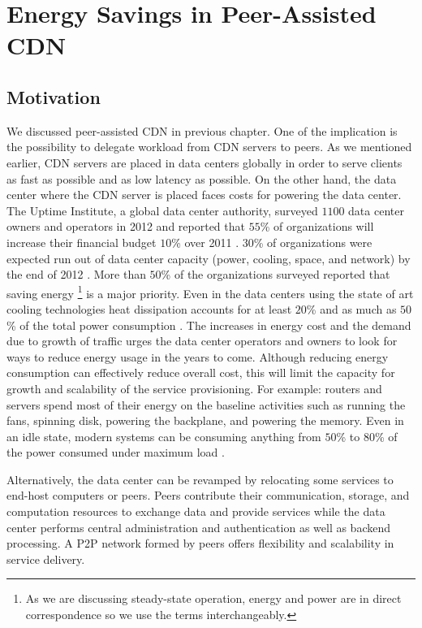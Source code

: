 \chapter{Energy Savings in Peer-Assisted CDN}

\section{Motivation}
We discussed peer-assisted CDN in previous chapter.
One of the implication is the possibility to delegate workload from CDN servers to peers. 
As we mentioned earlier, CDN servers are placed in data centers globally in order to serve clients as fast as possible and as low latency as possible.  
On the other hand, the data center where the CDN server is placed faces costs for powering the data center. 
The Uptime Institute, a global data center authority, surveyed $1100$ data center owners and operators in 2012 and reported that $55$\% of organizations will increase their financial budget $10$\% over 2011 \cite{uptime}.
$30$\% of organizations were expected run out of data center capacity (power, cooling, space, and network) by the end of 2012 \cite{uptime}.  
More than $50$\% of the organizations surveyed reported that saving energy \footnote{As we are discussing steady-state operation, energy and power are in direct correspondence so we use the terms interchangeably.}  is a major priority. 
Even in the data centers using the state of art cooling technologies heat dissipation accounts for at least $20$\% and as much as $50$\% of the total power consumption \cite{google}. 
The increases in energy cost and the demand due to growth of traffic urges the data center operators and owners to look for ways to reduce energy usage in the years to come. 
Although reducing energy consumption can effectively reduce overall cost, this will limit the capacity for growth and scalability of the service provisioning. 
For example: routers and servers spend most of their energy on the baseline activities such as running the fans, spinning disk, powering the backplane, and powering the memory. 
Even in an idle state, modern systems can be consuming anything from $50$\% to $80$\% of the power consumed under maximum load \cite{4404806,4509688}. 

Alternatively, the data center can be revamped by relocating some services to end-host computers or peers. 
Peers contribute their communication, storage, and computation resources to exchange data and provide services while the data center performs central administration and authentication as well as backend processing. 
A P2P network formed by peers offers flexibility and scalability in service delivery. 

